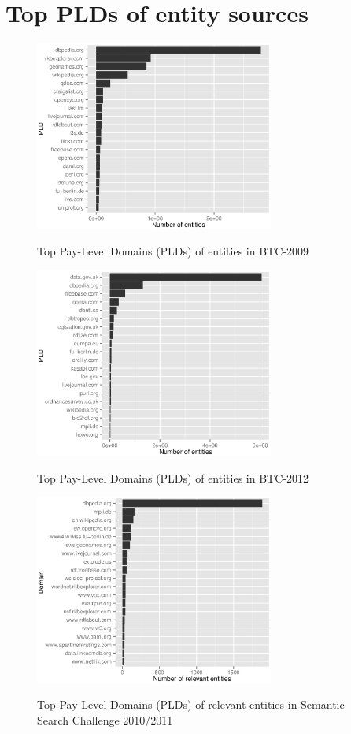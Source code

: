 \documentclass{article}
\begin{document}
\section{Top PLDs of entity sources}

\begin{figure}[!tbp]
  \caption{Top Pay-Level Domains (PLDs) of entities in BTC-2009}
  \centering
  \includegraphics[width=0.7\textwidth]{../btc-2009}
  \label{fig:btc2009}
\end{figure}
\begin{figure}[!tbp]
  \caption{Top Pay-Level Domains (PLDs) of entities in BTC-2012}
  \centering
  \includegraphics[width=0.7\textwidth]{../btc-2012}
  \label{fig:btc2012}
\end{figure}
\begin{figure}[!tbp]
  \caption{Top Pay-Level Domains (PLDs) of relevant entities in Semantic Search
    Challenge 2010/2011}
  \centering
  \includegraphics[width=0.7\textwidth]{../relevant}
  \label{fig:relevant}
\end{figure}
\end{document}
